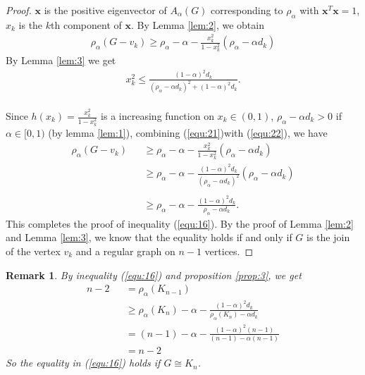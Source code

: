 \documentclass[amsthm]{elsart}
\newtheorem{remark}{Remark}[section]
\begin{document}
\begin{proof}
$\textbf{x}$ is the positive eigenvector of $A_\alpha (G)$ corresponding to $\rho _\alpha$  with $\textbf{x}^T \textbf{x} = 1$, $x_k$ is the $k$th component of $\textbf{x}$.
By Lemma \ref {lem:2}, we obtain \\
\begin{eqnarray} \label{equ:21}
\rho _\alpha (G - v_k)
    \geqslant \rho _\alpha - \alpha - \frac{x_k^2}{1 - x_k^2} (\rho _\alpha - \alpha d_k)
\end{eqnarray}
By Lemma \ref {lem:3} we get
\begin{eqnarray} \label{equ:22}
x_k^2 \leqslant \frac{(1 - \alpha)^2 d_k}{(\rho _\alpha - \alpha d_k)^2 + (1 - \alpha)^2 d_k}.
\end{eqnarray}
\\
Since $h(x_k) = \frac{x_k^2}{1 - x_k^2} $ is a increasing function on $x_k \in (0, 1)$, $\rho _\alpha - \alpha d_k > 0$ if $\alpha \in [0, 1)$ (by lemma \ref{lem:1}), combining (\ref{equ:21})with (\ref{equ:22}), we have  \\
\begin{eqnarray*}
\rho _\alpha (G - v_k)
  &&\geqslant \rho _\alpha - \alpha - \frac{x_k^2}{1 - x_k^2} (\rho _\alpha - \alpha d_k)
  \\ &&\geqslant \rho _\alpha - \alpha - \frac{(1 - \alpha)^2 d_k}{(\rho _\alpha - \alpha d_k)^2} (\rho _\alpha - \alpha d_k)  \\
  \\ &&\geqslant \rho _\alpha - \alpha - \frac{(1 - \alpha)^2 d_k}{\rho _\alpha - \alpha d_k}
.
\end{eqnarray*}
This completes the proof of inequality (\ref{equ:16}).
By the proof of Lemma \ref {lem:2} and Lemma \ref {lem:3}, we know that the equality holds if and only if $G$ is the join of the vertex $v_k$ and a regular graph on $n-1$ vertices.
\end{proof} 

\begin{remark}
By inequality (\ref{equ:16}) and proposition \ref{prop:3}, we get
\begin{eqnarray*}
n - 2 &&= \rho_\alpha(K_{n - 1})
\\ &&\geqslant \rho _\alpha(K_n) - \alpha - \frac{(1 - \alpha)^2 d_k}{\rho _\alpha(K_n) - \alpha d_k}
\\ &&= (n-1) - \alpha - \frac{(1 - \alpha)^2 (n-1)}{(n-1) - \alpha (n-1)}
\\ &&= n - 2
\end{eqnarray*}
So the equality in (\ref{equ:16})  holds if $G \cong K_n$.
\end{remark}
\end{document}
